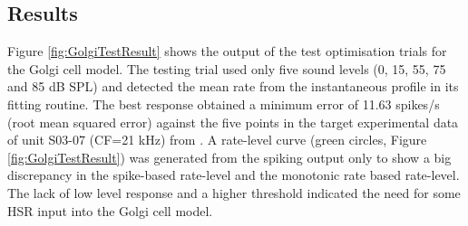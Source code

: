 







 \subsection{Results}

 Figure \ref{fig:GolgiTestResult} shows the output of the test optimisation
 trials for the Golgi cell model.  The testing trial used only five sound levels
 (0, 15, 55, 75 and 85 dB SPL) and detected the mean rate from the instantaneous
 profile in its fitting routine. The best response obtained a minimum error of
 11.63 spikes/s (root mean squared error) against the five points in the target
 experimental data of unit S03-07 (CF=21 kHz) from \citep{GhoshalKim:1996}. A
 rate-level curve (green circles, Figure \ref{fig:GolgiTestResult}) was
 generated from the spiking output only to show a big discrepancy in the
 spike-based rate-level and the monotonic rate based rate-level. The lack of low
 level response and a higher threshold indicated the need for some HSR input
 into the Golgi cell model.


